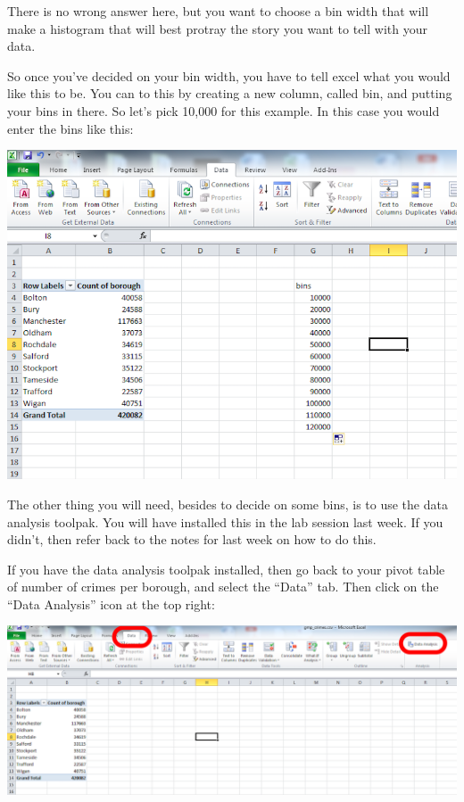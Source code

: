 \documentclass[
]{book}
\begin{document}
There is no wrong answer here, but you want to choose a bin width that will make a histogram that will best protray the story you want to tell with your data.

So once you've decided on your bin width, you have to tell excel what you would like this to be. You can to this by creating a new column, called bin, and putting your bins in there. So let's pick 10,000 for this example. In this case you would enter the bins like this:

\includegraphics{imgs/bin_col.png}

The other thing you will need, besides to decide on some bins, is to use the data analysis toolpak. You will have installed this in the lab session last week. If you didn't, then refer back to the notes for last week on how to do this.

If you have the data analysis toolpak installed, then go back to your pivot table of number of crimes per borough, and select the ``Data'' tab. Then click on the ``Data Analysis'' icon at the top right:

\includegraphics{imgs/dat_loc.png}
\end{document}
